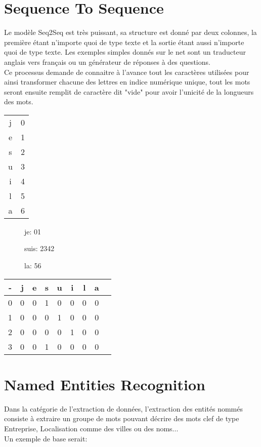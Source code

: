 \pagebreak
\section{Sequence To Sequence}
Le modèle Seq2Seq est très puissant, sa structure est donné par deux colonnes, la première étant n'importe quoi de type texte et la sortie étant aussi n'importe quoi de type texte. Les exemples simples donnés sur le net sont un traducteur anglais vers français ou un générateur de réponses à des questions.\\
\linebreak
Ce processus demande de connaitre à l'avance tout les caractères utilisées pour ainsi transformer chacune des lettres en indice numérique unique, tout les mots seront ensuite remplit de caractère dit "vide" pour avoir l'unicité de la longueurs des mots.\\

\begin{multicols}{3}
\begin{tabular}{c|c}
j & 0\\
e & 1\\
s & 2\\
u & 3\\
i & 4\\
l & 5\\
a & 6\\
\end{tabular}
\begin{description}
\item[] je: 01
\item[] suis: 2342
\item[] la: 56
\end{description}
\begin{tabular}{c|cccccccc}
- & j & e & s & u & i & l & a\\
\hline
0 & 0 & 0 & 1 & 0 & 0 & 0 & 0\\
1 & 0 & 0 & 0 & 1 & 0 & 0 & 0\\
2 & 0 & 0 & 0 & 0 & 1 & 0 & 0\\
3 & 0 & 0 & 1 & 0 & 0 & 0 & 0\\
\end{tabular}
\end{multicols}

\pagebreak
\section{Named Entities Recognition}
Dans la catégorie de l'extraction de données, l'extraction des entités nommés consiste à extraire un groupe de mots pouvant décrire des mots clef de type Entreprise, Localisation comme des villes ou des noms...\\
Un exemple de base serait:\\

